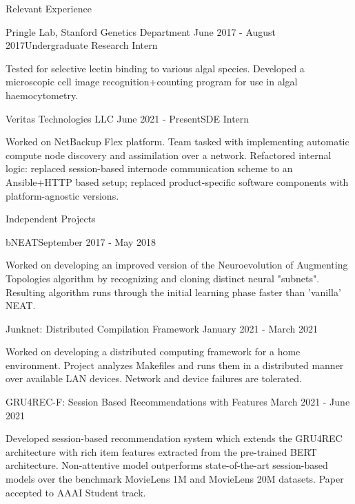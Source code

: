 \documentclass{resume} %
\begin{document}
\begin{resumeSection}{Relevant Experience} \itemsep -10pt

\begin{resumeSubsection}{Pringle Lab, Stanford Genetics Department}
	{June 2017 - August 2017}{Undergraduate Research Intern}{}
\item Tested for selective lectin binding to various algal species. Developed a
	microscopic cell image recognition+counting program for use in algal
	haemocytometry.
\end{resumeSubsection}
\begin{resumeSubsection}{Veritas Technologies LLC}
	{June 2021 - Present}{SDE Intern}{}
\item Worked on NetBackup Flex platform. Team tasked with implementing
	automatic compute node discovery and assimilation over a network.
	Refactored internal logic: replaced session-based internode
	communication scheme to an Ansible+HTTP based setup; replaced
	product-specific software components with platform-agnostic versions. 
\end{resumeSubsection}

\end{resumeSection}


\begin{resumeSection}{Independent Projects} \itemsep -10pt

\begin{resumeSubsection}{bNEAT}{September 2017 - May 2018}{}{}
\item Worked on developing an improved version of the Neuroevolution of
	Augmenting Topologies algorithm by recognizing and cloning distinct
	neural "subnets". Resulting algorithm runs through the initial learning
	phase faster than 'vanilla' NEAT.
\end{resumeSubsection}
\begin{resumeSubsection}{Junknet: Distributed Compilation Framework}
	{January 2021 - March 2021}{}{}
\item Worked on developing a distributed computing framework for a home
	environment. Project analyzes Makefiles and runs them in a distributed
	manner over available LAN devices. Network and device failures are
	tolerated.
\end{resumeSubsection}
\begin{resumeSubsection}{GRU4REC-F: Session Based Recommendations with Features}
	{March 2021 - June 2021}{}{}
\item Developed session-based recommendation system which extends the GRU4REC
	architecture with rich item features extracted from the pre-trained
	BERT architecture. Non-attentive model outperforms state-of-the-art
	session-based models over the benchmark MovieLens 1M and MovieLens 20M
	datasets. Paper accepted to AAAI Student track. 
\end{resumeSubsection}

\end{resumeSection}
\end{document}
